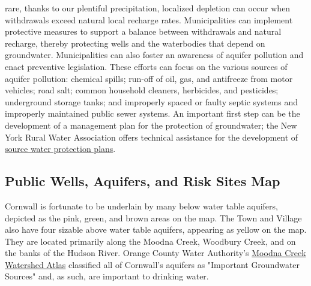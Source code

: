 rare, thanks to our plentiful precipitation, localized depletion can occur when 
withdrawals exceed natural local recharge rates. Municipalities can implement 
protective measures to support a balance between withdrawals and natural 
recharge, thereby protecting wells and the waterbodies that depend on 
groundwater. Municipalities can also foster an awareness of aquifer pollution 
and enact preventive legislation. These efforts can focus on the various sources 
of aquifer pollution: chemical spills; run-off of oil, gas, and antifreeze from 
motor vehicles; road salt; common household cleaners, herbicides, and 
pesticides; underground storage tanks; and improperly spaced or faulty septic 
systems and improperly maintained public sewer systems. An important first step 
can be the development of a management plan for the protection of groundwater; 
the New York Rural Water Association offers technical assistance for the 
development of \href{ 
http://www.nyruralwater.org/sites/default/files/Fact\%20Sheet10\_1-5-2018.pdf}{ 
source water protection plans}.

\subsection*{Public Wells, Aquifers, and Risk Sites Map}
Cornwall is fortunate to be underlain by many below water table aquifers, 
depicted as the pink, green, and brown areas on the map. The Town and Village 
also have four sizable above water table aquifers, appearing as yellow on the 
map. They are located primarily along the Moodna Creek, Woodbury Creek, and on 
the banks of the Hudson River. Orange County Water Authority's 
\href{
http://www.kj-seqra.com/507Acres/ReferenceMaterial/OCWA\%202008\%20Moodna\%20Wat
ershed\%20Atlas\%20(39MB).pdf}{Moodna Creek Watershed Atlas} classified all of 
Cornwall’s aquifers as "Important Groundwater Sources" and, as such, are 
important to drinking water.


\label{map:wells}
\clearpage
